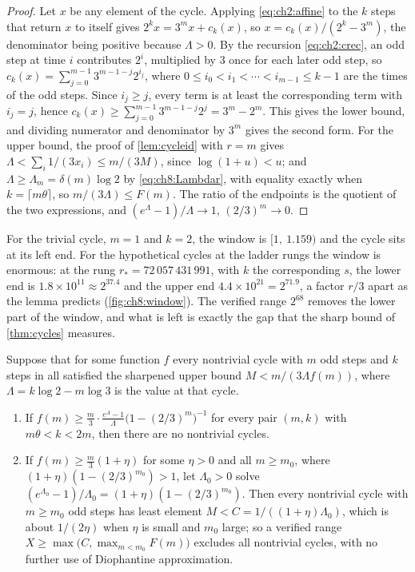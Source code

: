 \begin{proof}
Let $x$ be any element of the cycle. Applying \eqref{eq:ch2:affine} to the
$k$ steps that return $x$ to itself gives $2^kx=3^mx+c_k(x)$, so
$x=c_k(x)/(2^k-3^m)$, the denominator being positive because $\Lambda>0$. By
the recursion \eqref{eq:ch2:crec}, an odd step at time $i$ contributes $2^i$,
multiplied by $3$ once for each later odd step, so
$c_k(x)=\sum_{j=0}^{m-1}3^{m-1-j}2^{i_j}$, where $0\le i_0<i_1<\cdots<i_{m-1}\le
k-1$ are the times of the odd steps. Since $i_j\ge j$, every term is at least
the corresponding term with $i_j=j$, hence
$c_k(x)\ge\sum_{j=0}^{m-1}3^{m-1-j}2^{j}=3^m-2^m$. This gives the lower bound,
and dividing numerator and denominator by $3^m$ gives the second form.
For the upper bound, the proof of \cref{lem:cycleid} with $r=m$ gives $\Lambda<\sum_i1/(3x_i)\le m/(3M)$, since $\log(1+u)<u$; and $\Lambda\ge\Lambda_m=\delta(m)\log2$ by \eqref{eq:ch8:Lambdar}, with equality exactly when $k=\lceil m\theta\rceil$, so $m/(3\Lambda)\le F(m)$.
The ratio of the endpoints is the quotient of the two
expressions, and $(e^\Lambda-1)/\Lambda\to1$, $(2/3)^m\to0$.
\end{proof}

For the trivial cycle, $m=1$ and $k=2$, the window is $[1,\ 1.159)$ and the
cycle sits at its left end. For the hypothetical cycles at the ladder rungs the
window is enormous: at the rung $r_*=72\,057\,431\,991$, with $k$ the
corresponding $s$, the lower end is $1.8\times10^{11}\approx2^{37.4}$ and the
upper end $4.4\times10^{21}=2^{71.9}$, a factor $r/3$ apart as the lemma
predicts (\cref{fig:ch8:window}). The verified range $2^{68}$ removes the lower
part of the window, and what is left is exactly the gap that the sharp bound
of \cref{thm:cycles} measures.

\begin{corollary}\label{cor:ch8:window}
Suppose that for some function $f$ every nontrivial cycle with $m$ odd steps and $k$ steps in all satisfied the sharpened upper bound $M<m/(3\Lambda f(m))$, where $\Lambda=k\log2-m\log3$ is the value at that cycle.
\begin{enumerate}[label=(\roman*),leftmargin=2em]
\item If $f(m)\ge\frac m3\cdot\frac{e^{\Lambda}-1}{\Lambda}\bigl(1-(2/3)^m\bigr)^{-1}$ for every pair $(m,k)$ with $m\theta<k<2m$, then there are no nontrivial cycles.
\item If $f(m)\ge\frac m3(1+\eta)$ for some $\eta>0$ and all $m\ge m_0$, where $(1+\eta)(1-(2/3)^{m_0})>1$, let $\Lambda_0>0$ solve $(e^{\Lambda_0}-1)/\Lambda_0=(1+\eta)(1-(2/3)^{m_0})$. Then every nontrivial cycle with $m\ge m_0$ odd steps has least element $M<C=1/((1+\eta)\Lambda_0)$, which is about $1/(2\eta)$ when $\eta$ is small and $m_0$ large; so a verified range $X\ge\max\bigl(C,\max_{m<m_0}F(m)\bigr)$ excludes all nontrivial cycles, with no further use of Diophantine approximation.
\end{enumerate}
\end{corollary}

